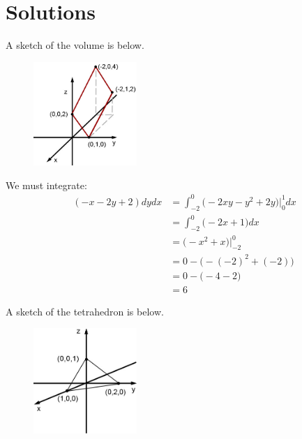 \documentclass{article}
\begin{document}
\section*{Solutions}

\BEN
\item %
\BEN
\item A sketch of the volume is below. 
\begin{figure}[h]
  \vspace{-1pt}
  \begin{center}
    \includegraphics[width=0.35\textwidth]{ImgSolid.jpg}
  \end{center}
\end{figure}
\item We must integrate:
\begin{align*}
  \mathop{\int_{-2}^0 \! \int_0^1} (-x-2y+2 ) dydx 
  &= \int_{-2}^0 \big( -2xy -y^2 + 2y \big) \big|_0^1 dx \\
  &= \int_{-2}^0 \Big( -2x + 1  \Big) dx \\
  &= \Big(-x^2 + x \Big) \Big|_{-2}^0  \\  
  &= 0- \big(- (-2)^2 + (-2)\big)\\
  &= 0- \big(- 4 -2\big)\\
  &= 6
\end{align*}
\EEN
\item %
\BEN
\item A sketch of the tetrahedron is below. 
\begin{figure}[h]
  \vspace{-1pt}
  \begin{center}
    \includegraphics[width=0.35\textwidth]{ImgTetExample.jpg}
  \end{center}
\end{figure}
\end{document}
